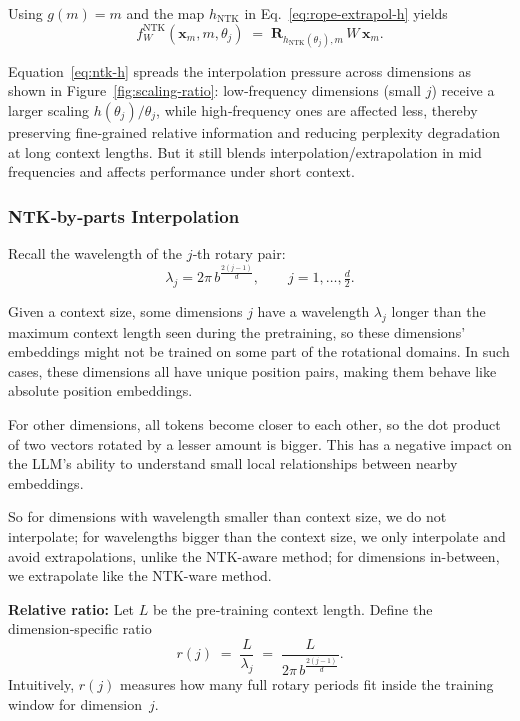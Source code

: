 \begin{definition}\label{def:ntk-aware}
Using $g(m)=m$ and the map $h_{\text{NTK}}$ in
Eq.~\eqref{eq:rope-extrapol-h} yields
\begin{equation}
  f_W^{\text{NTK}}(\mathbf x_m,m,\theta_j)
  \;=\;
  \mathbf R_{h_{\text{NTK}}(\theta_j),m}\,
  W\,\mathbf x_m .
  \label{eq:ntk-final}
\end{equation}
\end{definition}

Equation~\eqref{eq:ntk-h} spreads the interpolation pressure across
dimensions as shown in Figure~\ref{fig:scaling-ratio}: low‑frequency dimensions (small $j$) receive a larger
scaling $h(\theta_j)/\theta_j$, while high‑frequency ones are
affected less, thereby preserving fine‑grained relative information
and reducing perplexity degradation at long context lengths. But it still blends interpolation/extrapolation in mid frequencies and affects performance under short context. 


\subsubsection{NTK‑by‑parts Interpolation}
\label{sec:ntk-by-parts}

Recall the wavelength of the $j$‑th rotary pair:
\[
  \lambda_j = 2\pi\,b^{\tfrac{2(j-1)}{d}},
  \qquad j = 1,\dots,\tfrac{d}{2}.
\]

Given a context size, some dimensions $j$ have a wavelength $\lambda_j$ longer than the maximum context length seen during the pretraining, so these dimensions' embeddings might not be trained on some part of the rotational domains. In such cases, these dimensions all have unique position pairs, making them behave like absolute position embeddings. 

For other dimensions, all tokens become closer to each other, so the dot product of two vectors rotated by a lesser amount is bigger. This has a negative impact on the LLM's ability to understand small local relationships between nearby embeddings. 

So for dimensions with wavelength smaller than context size, we do not interpolate; for wavelengths bigger than the context size, we only interpolate and avoid extrapolations, unlike the NTK-aware method; for dimensions in-between, we extrapolate like the NTK-ware method. 

\noindent\textbf{Relative ratio:}
Let $L$ be the pre‑training context length.  
Define the dimension‑specific ratio
\begin{equation}
  r(j)
  \;=\;
  \frac{L}{\lambda_j}
  \;=\;
  \frac{L}{2\pi\,b^{\tfrac{2(j-1)}{d}}}.
  \label{eq:ratio-r}
\end{equation}
Intuitively, $r(j)$ measures how many full rotary periods fit inside
the training window for dimension~$j$.

